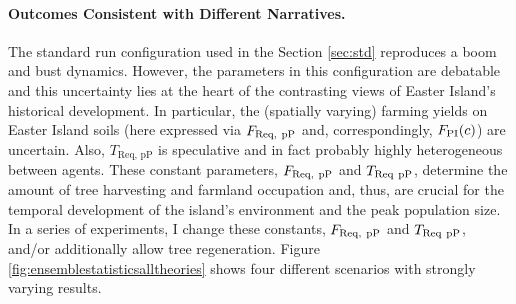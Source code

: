 \paragraph{Outcomes Consistent with Different Narratives.}
The standard run configuration used in the Section \ref{sec:std} reproduces a boom and bust dynamics. 
However, the parameters in this configuration are debatable and this uncertainty lies at the heart of the contrasting views of Easter Island's historical development.
In particular, the (spatially varying) farming yields on Easter Island soils (here expressed via $F_{\rm Req, \ pP}$ and, correspondingly, $F_{\rm PI}(c)$) are uncertain.
Also, $T_\text{Req, pP}$ is speculative and in fact probably highly heterogeneous between agents.
These constant parameters, $F_{\rm Req, \ pP}$ and $T_{\rm Req\ pP}$, determine the amount of tree harvesting and farmland occupation and, thus, are crucial for the temporal development of the island's environment and the peak population size. 
In a series of experiments, I change these constants, $F_{\rm Req, \ pP}$ and $T_{\rm Req\ pP}$, and/or additionally allow tree regeneration.
Figure \ref{fig:ensemblestatisticsalltheories} shows four different scenarios with strongly varying results.
